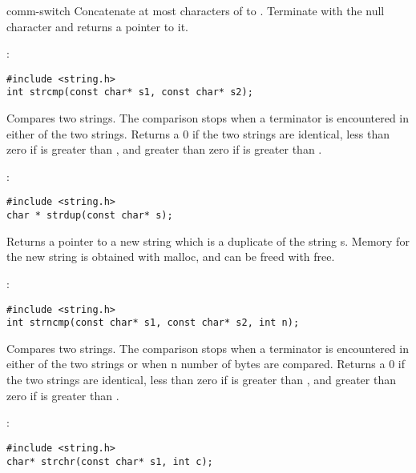 \begin{Ventry2}{comm-switch  }
     Concatenate at most  characters of  to
	. Terminate  with the null character and returns a
	pointer to it.

\item[strcmp]
\label{item:strcmp}
:
\begin{production}
\begin{verbatim}
#include <string.h>
int strcmp(const char* s1, const char* s2);
\end{verbatim}
\end{production}

  Compares two strings.  The comparison stops when a 
terminator is encountered in either of the two strings. 
Returns a 0 if the two strings are identical, less than
zero if  is greater than , and greater than zero if 
is greater than .

\item[strdup]
\label{item:strdup}
:
\begin{production}
\begin{verbatim}
#include <string.h>
char * strdup(const char* s);
\end{verbatim}
\end{production}

      Returns a pointer to a new string which is a duplicate of the
       string s.  Memory for the new string is obtained with
       malloc, and can be freed with free.


\item[strncmp]
\label{item:strncmp}
:
\begin{production}
\begin{verbatim}
#include <string.h>
int strncmp(const char* s1, const char* s2, int n);
\end{verbatim}
\end{production}

 Compares  two strings.  The comparison stops when a 
terminator is encountered in either of the two strings or
when n number of bytes are compared.  Returns a 0 if the
two strings are identical, less than zero if  is greater
than , and greater than zero if  is greater than .

\item[strchr]
\label{item:strchr}
:
\begin{production}
\begin{verbatim}
#include <string.h>
char* strchr(const char* s1, int c);
\end{verbatim}
\end{production}


\end{Ventry2}
